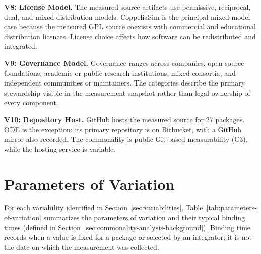 \textbf{V8: License Model.} The measured source artifacts use permissive, reciprocal, dual, and mixed distribution models. CoppeliaSim is the principal mixed-model case because the measured GPL source coexists with commercial and educational distribution licences. License choice affects how software can be redistributed and integrated.

\textbf{V9: Governance Model.} Governance ranges across companies, open-source foundations, academic or public research institutions, mixed consortia, and independent communities or maintainers. The categories describe the primary stewardship visible in the measurement snapshot rather than legal ownership of every component.

\textbf{V10: Repository Host.} GitHub hosts the measured source for 27 packages. ODE is the exception: its primary repository is on Bitbucket, with a GitHub mirror also recorded. The commonality is public Git-based measurability (C3), while the hosting service is variable.

\section{Parameters of Variation}
\label{sec:parameters-of-variation}

For each variability identified in Section~\ref{sec:variabilities}, Table~\ref{tab:parameters-of-variation} summarizes the parameters of variation and their typical binding times (defined in Section~\ref{sec:commonality-analysis-background}). Binding time records when a value is fixed for a package or selected by an integrator; it is not the date on which the measurement was collected.

